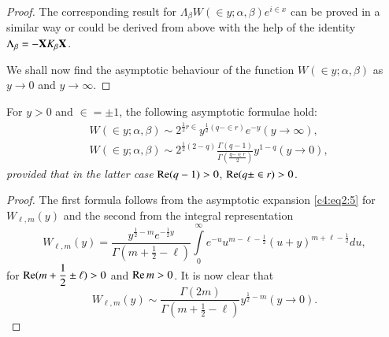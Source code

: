 \begin{proof}
The corresponding result for $\Lambda_{\beta}W(\in y ; \alpha,
\beta)e^{i\in x}$ can be proved in a similar way or could be
derived from above with the help of the identity
$\Lambda_{\beta}=-\mathbf{X} K_{\beta} \mathbf{X}$.

We shall now find the asymptotic behaviour of the function
$W(\in y; \alpha, \beta)$ as $y\to 0$ and $y\to \infty$. 
\end{proof}

\begin{lem}\label{chap4:lem8}
For $y>0$ and $\in =\pm 1$, the following asymptotic formulae
hold:
\begin{align*}
& W(\in y ; \alpha, \beta) \sim 2^{\frac{1}{2}r\in}
  y^{\frac{1}{2}(q-\in r)} e^{-y} (y\to \infty), \\
& W(\in y; \alpha, \beta) \sim 2^{\frac{1}{2}(2-q)}
  \frac{\Gamma(q-1)}{\Gamma(\frac{q-\in r}{2})} y^{1-q} (y\to
  0), 
\end{align*}
\textit{provided that in the latter case} $\operatorname{Re}(q-1)>0$, $\operatorname{Re}(q\pm
\in r)>0$.
\end{lem}

\begin{proof}
The first formula follows from the asymptotic expansion \eqref{c4:eq2:5} for
$W_{\ell,m}(y)$ and the second from the integral representation
$$
W_{\ell,m}(y) = \frac{y^{\frac{1}{2}-m}
  e^{-\frac{1}{2}y}}{\Gamma(m+\frac{1}{2}-\ell)}
\int\limits^{\infty}_0 e^{-u} u^{m-\ell-\frac{1}{2}}
(u+y)^{m+\ell-\frac{1}{2}} du,
$$
for $\operatorname{Re}(m+\dfrac{1}{2}\pm \ell)>0$ and $\operatorname{Re} m >0$. It is now clear
that
$$
W_{\ell,m}(y) \sim \frac{\Gamma(2m)}{\Gamma(m+\frac{1}{2}-\ell)}
y^{\frac{1}{2}-m} (y\to 0).
$$
\end{proof}

